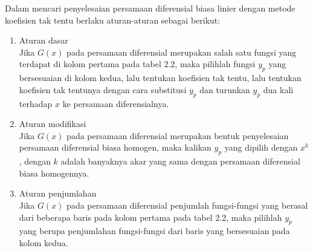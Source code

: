 Dalam mencari penyelesaian persamaan diferensial biasa linier dengan metode koefisien tak tentu berlaku aturan-aturan sebagai berikut:

\begin{enumerate}[1.]

	\item Aturan dasar \\

	Jika \begin{math} G(x) \end{math} pada persamaan diferensial merupakan salah satu fungsi yang terdapat di kolom pertama pada tabel 2.2, maka pilihlah fungsi \begin{math} y_p \end{math} yang bersesuaian di kolom kedua, lalu tentukan koefisien tak tentu, lalu tentukan koefisien tak tentunya dengan cara substitusi \begin{math} y_p \end{math} dan turunkan \begin{math} y_p \end{math} dua kali terhadap \begin{math} x \end{math} ke persamaan diferensialnya.

	\item Aturan modifikasi \\

	Jika \begin{math} G(x) \end{math} pada persamaan diferensial merupakan bentuk penyelesaian persamaan diferensial biasa homogen, maka kalikan \begin{math} y_p \end{math} yang dipilih dengan \begin{math} x^{k} \end{math}, dengan \begin{math} k \end{math} adalah banyaknya akar yang sama dengan persamaan diferensial biasa homogennya.

	\item Aturan penjumlahan \\

	Jika \begin{math} G(x) \end{math} pada persamaan diferensial penjumlah fungsi-fungsi yang berasal dari beberapa baris pada kolom pertama pada tabel 2.2, maka pilihlah \begin{math} y_p \end{math} yang berupa penjumlahan fungsi-fungsi dari baris yang bersesuaian pada kolom kedua.

\end{enumerate}

